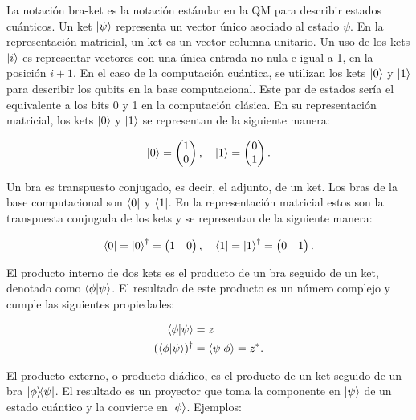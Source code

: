 La notación bra-ket es la notación estándar en la QM para describir estados cuánticos. Un ket $\ket{\psi}$ representa un vector único asociado al estado $\psi$. En la representación matricial, un ket es un vector columna unitario. Un uso de los kets $\ket{i}$ es representar vectores con una única entrada no nula e igual a 1, en la posición $i+1$. En el caso de la computación cuántica, se utilizan los kets $\ket{0}$ y $\ket{1}$ para describir los qubits en la base computacional. Este par de estados sería el equivalente a los bits 0 y 1 en la computación clásica. En su representación matricial, los kets $\ket{0}$ y $\ket{1}$ se representan de la siguiente manera:

\[\ket{0} = \begin{pmatrix} 1 \\ 0 \end{pmatrix}, \quad \ket{1} = \begin{pmatrix} 0 \\ 1 \end{pmatrix}.\]

Un bra es transpuesto conjugado, es decir, el adjunto, de un ket. Los bras de la base computacional son $\bra{0}$ y $\bra{1}$. En la representación matricial estos son la transpuesta conjugada de los kets y se representan de la siguiente manera:

\[\bra{0} = \ket{0}^\dagger = \begin{pmatrix} 1 & 0 \end{pmatrix}, \quad \bra{1} = \ket{1}^\dagger = \begin{pmatrix} 0 & 1 \end{pmatrix}.\]

El producto interno de dos kets es el producto de un bra seguido de un ket, denotado como $\braket{\phi}{\psi}$. El resultado de este producto es un número complejo y cumple las siguientes propiedades:

\begin{align}
    \braket{\phi}{\psi} &= z \\
    (\braket{\phi}{\psi})^\dagger &= \braket{\psi}{\phi} = z^* .
\end{align}

El producto externo, o producto diádico, es el producto de un ket seguido de un bra $\ketbra{\phi}{\psi}$. El resultado es un proyector que toma la componente en $\ket{\psi}$ de un estado cuántico y la convierte en $\ket{\phi}$. Ejemplos:

